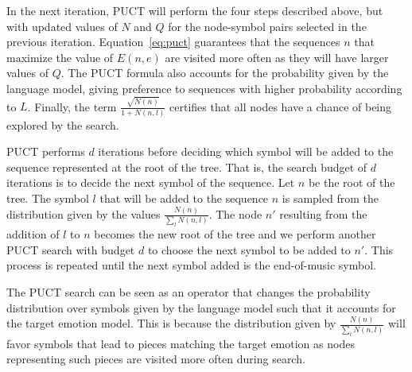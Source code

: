 In the next iteration, PUCT will perform the four steps described above, but with updated values of $N$ and $Q$ for the node-symbol pairs selected in the previous iteration. Equation~\ref{eq:puct} guarantees that the sequences $n$ that maximize the value of $E(n, e)$ are visited more often as they will have larger values of $Q$. The PUCT formula also accounts for the probability given by the language model, giving preference to sequences with higher probability according to $L$. Finally, the term $\frac{\sqrt{N(n)}}{1 + N(n, l)}$ certifies that all nodes have a chance of being explored by the search.

PUCT performs $d$ iterations before deciding which symbol will be added to the sequence represented at the root of the tree. That is, the search budget of $d$ iterations is to decide the next symbol of the sequence. Let $n$ be the root of the tree. The symbol $l$ that will be added to the sequence $n$ is sampled from the distribution given by the values $\frac{N(n)}{\sum_{l} N(n, l)}$. The node $n'$ resulting from the addition of $l$ to $n$ becomes the new root of the tree and we perform another PUCT search with budget $d$ to choose the next symbol to be added to $n'$. This process is repeated until the next symbol added is the end-of-music symbol.

The PUCT search can be seen as an operator that changes the probability distribution over symbols given by the language model such that it accounts for the target emotion model. This is because the distribution given by $\frac{N(n)}{\sum_{l} N(n, l)}$ will favor symbols that lead to pieces matching the target emotion as nodes representing such pieces are visited more often during search.


